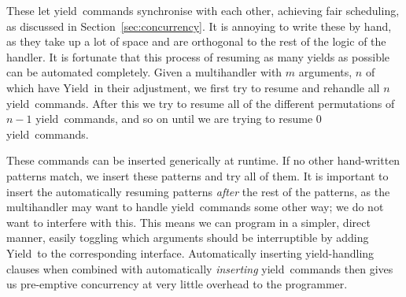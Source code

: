 \documentclass[msc,deptreport,cs]{infthesis} %
\newcommand{\texthighlight}[1]{%
  \colorbox{red!20}{#1}}
\newcommand\yield{\textsf{yield}\xspace}
\newcommand\Yield{\textsf{Yield}\xspace}
\begin{document}

These let \yield~commands synchronise with each other, achieving fair
scheduling, as discussed in Section~\ref{sec:concurrency}. It is annoying to
write these by hand, as they take up a lot of space and are orthogonal to the
rest of the logic of the handler. It is fortunate that this process of resuming
as many yields as possible can be automated completely. Given a multihandler
with $m$ arguments, $n$ of which have \Yield~in their adjustment, we first try
to resume and rehandle all $n$ \yield~commands. After this we try to resume all
of the different permutations of $n-1$ \yield~commands, and so on until we are
trying to resume 0 \yield~commands.
%




These commands can be inserted generically at runtime. If no other hand-written
patterns match, we insert these patterns and try all of them. It is important to
insert the automatically resuming patterns \emph{after} the rest of the
patterns, as the multihandler may want to handle \yield~commands some other way;
we do not want to interfere with this. This means we can program in a simpler,
direct manner, easily toggling which arguments should be interruptible by adding
\Yield~to the corresponding interface. Automatically inserting \yield-handling
clauses when combined with automatically \emph{inserting} \yield~commands then
gives us pre-emptive concurrency at very little overhead to the programmer.
\end{document}
